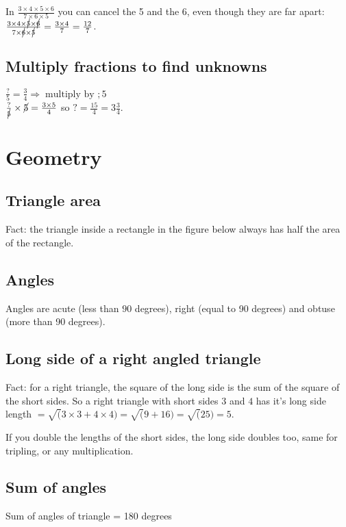 \documentclass[fullpage,twocolumn]{article}
\begin{document}
In $\frac{3 \times 4 \times 5 \times 6}{7 \times 6 \times 5}$ you can cancel
the 5 and the 6, even though they are far apart: $\frac{3 \times 4 \times \cancel{5}
\times \cancel{6}}{ 7 \times  \cancel{6} \times \cancel{5}} = \frac{3 \times 4}{7} = \frac{12}{7}$.

\subsection{Multiply fractions to find unknowns}

$\frac{?}{5} = \frac{3}{4} \Rightarrow \; \mbox{multiply by } ; 5$\\
$\frac{?}{\cancel{5}} \times \cancel{5} = \frac{3 \times 5}{4}$ so  $? = \frac{15}{4} = 3\frac{3}{4}$.


\section{Geometry}

\subsection{Triangle area}
Fact: the triangle inside a rectangle in the figure below always has half the area
of the rectangle.

\vspace{3in}

\subsection{Angles}


Angles are acute (less than $90$ degrees), right (equal to 90 degrees) and obtuse (more than 90 degrees).

\subsection{Long side of a right angled triangle}

Fact: for a right triangle, the square of the long side is the sum of the square of
the short sides. So a right triangle with short sides $3$ and $4$ has it's long
side length $ = \sqrt(3 \times 3 + 4 \times 4) = \sqrt(9 + 16) = \sqrt(25) = 5$.

If you double the lengths of the short sides, the long side doubles too, same
for tripling, or any multiplication.

\subsection{Sum of angles}
Sum of angles of triangle = 180 degrees 
\end{document}
